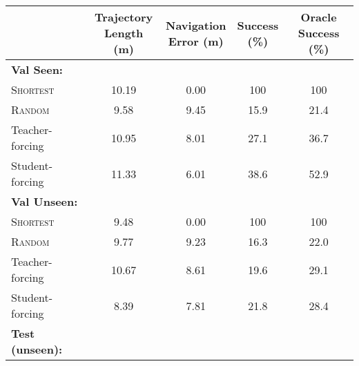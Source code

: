 \documentclass[10pt,twocolumn,letterpaper]{article}
\begin{document}
\setlength{\tabcolsep}{.45em}
\begin{table}[]
	\footnotesize
	\begin{center}
		\begin{tabular}{lcccc}
			\midrule
			& \makecell{\textbf{Trajectory}\\ \textbf{Length} \textbf{(m)}} & \makecell{\textbf{Navigation}\\ \textbf{Error} \textbf{(m)}} & \makecell{\textbf{Success}\\ \textbf{(\%)}} & \makecell{\textbf{Oracle}\\ \textbf{Success} \textbf{(\%)}} \\
			\midrule
			\textbf{Val Seen:}   &                           &                          &                  &                  \\
			\textsc{Shortest}      &           10.19                &    0.00                      &      100           &        100          \\
			\textsc{Random}      &           9.58               &    9.45                      &       15.9           &        21.4          \\
			Teacher-forcing      &         10.95                  &       8.01                   &       27.1           &         36.7        \\
			Student-forcing      &         11.33                  &      6.01                    &        38.6          &         52.9        \\
			\midrule
			\textbf{Val Unseen:} &                           &                          &                  &                  \\
			\textsc{Shortest}      &         9.48                  &       0.00                   &     100             &       100           \\
			\textsc{Random}      &          9.77                 &      9.23                    &      16.3            &          22.0        \\
			Teacher-forcing      &            10.67               &        8.61                  &      19.6            &       29.1           \\
			Student-forcing      &       8.39                    &       7.81                   &      21.8           &      28.4            \\
			\midrule     
			\textbf{Test (unseen):} &                           &                          &                  &                  \\

\end{tabular}
\end{center}
\end{table}
\end{document}
